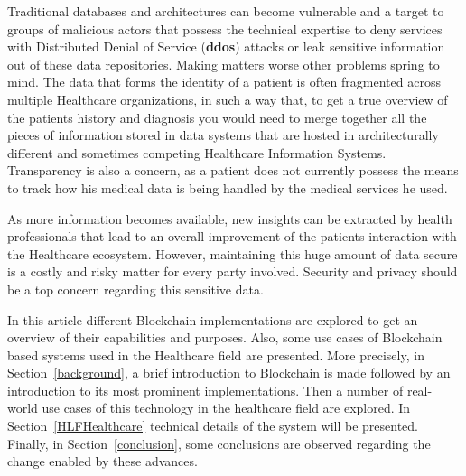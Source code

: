 Traditional databases and architectures can become vulnerable and a target to
groups of malicious actors that possess the technical expertise to deny
services with Distributed Denial of Service (\textbf{ddos}) attacks or leak
sensitive information out of these data repositories. Making matters worse
other problems spring to mind. The data that forms the identity of a patient is
often fragmented across multiple Healthcare organizations, in such a way that,
to get a true overview of the patients history and diagnosis you would need to
merge together all the pieces of information stored in data systems that are
hosted in architecturally different and sometimes competing Healthcare
Information Systems. Transparency is also a concern, as a patient does not
currently possess the means to track how his medical data is being handled by
the medical services he used.


As more information becomes available, new insights can be extracted by health
professionals that lead to an overall improvement of the patients interaction
with the Healthcare ecosystem. However, maintaining this huge amount of data
secure is a costly and risky matter for every party involved. Security and
privacy should be a top concern regarding this sensitive data. 

In this article different Blockchain implementations are explored to get an
overview of their capabilities and purposes. Also, some use cases of Blockchain
based systems used in the Healthcare field are presented. More precisely, in
Section~\ref{background}, a brief introduction to Blockchain is made followed
by an introduction to its most prominent implementations. Then a number of
real-world use cases of this technology in the healthcare field are explored.
In Section~\ref{HLFHealthcare} technical details of the system will be
presented. Finally, in Section~\ref{conclusion}, some conclusions are observed
regarding the change enabled by these advances.
